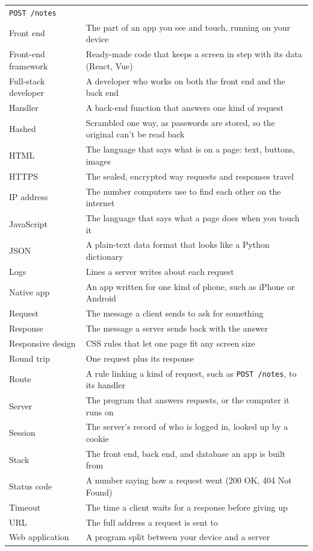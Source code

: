 \begin{booktable}
\begin{longtable}{>{\raggedright\arraybackslash}p{}>{\raggedright\arraybackslash}p{}}
\texttt{POST\ /notes} \\
Front end & The part of an app you see and touch, running on your device \\
Front-end framework & Ready-made code that keeps a screen in step with its data (React, Vue) \\
Full-stack developer & A developer who works on both the front end and the back end \\
Handler & A back-end function that answers one kind of request \\
Hashed & Scrambled one way, as passwords are stored, so the original can't be
read back \\
HTML & The language that says what is on a page: text, buttons, images \\
HTTPS & The sealed, encrypted way requests and responses travel \\
IP address & The number computers use to find each other on the internet \\
JavaScript & The language that says what a page does when you touch it \\
JSON & A plain-text data format that looks like a Python dictionary \\
Logs & Lines a server writes about each request \\
Native app & An app written for one kind of phone, such as iPhone or Android \\
Request & The message a client sends to ask for something \\
Response & The message a server sends back with the answer \\
Responsive design & CSS rules that let one page fit any screen size \\
Round trip & One request plus its response \\
Route & A rule linking a kind of request, such as \texttt{POST\ /notes}, to its
handler \\
Server & The program that answers requests, or the computer it runs on \\
Session & The server's record of who is logged in, looked up by a cookie \\
Stack & The front end, back end, and database an app is built from \\
Status code & A number saying how a request went (200 OK, 404 Not Found) \\
Timeout & The time a client waits for a response before giving up \\
URL & The full address a request is sent to \\
Web application & A program split between your device and a server \\
\end{longtable}
\end{booktable}
